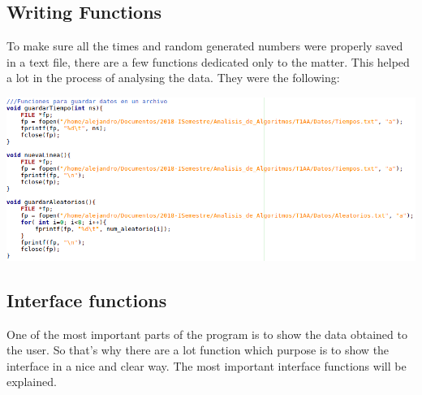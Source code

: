 \documentclass[legalpaper,12pt]{article}
\begin{document}
\subsection{Writing Functions}
\justifying
To make sure all the times and random generated numbers were properly saved in a text file, there are a few functions dedicated only to the matter. This helped a lot in the process of analysing the data. They were the following:

\begin{center}{\includegraphics[width=1\textwidth]{escribir.png}\\[1cm]}\end{center}


\subsection{Interface functions}
\justifying
One of the most important parts of the program is to show the data obtained to the user. So that's why there are a lot function which purpose is to show the interface in a nice and clear way. The most important interface functions will be explained.
\end{document}
